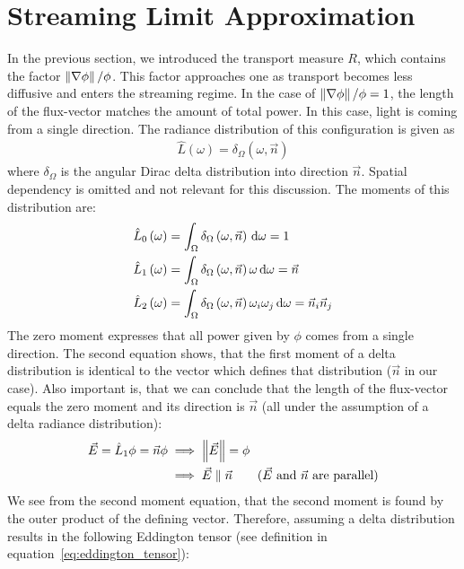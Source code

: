 \section{Streaming Limit Approximation}
\label{sec:fld_streaming_limit_approximation}


In the previous section, we introduced the transport measure $R$, which contains the factor $\left\lVert\nabla\phi\right\rVert/\phi$. This factor approaches one as transport becomes less diffusive and enters the streaming regime. In the case of $\left\lVert\nabla\phi\right\rVert/\phi=1$, the length of the flux-vector matches the amount of total power. In this case, light is coming from a single direction. The radiance distribution of this configuration is given as
\begin{align}
\hat{L}\left(\omega\right)=\delta_{\Omega}\left(\omega,\vec{n}\right)
\end{align}
where $\delta_{\Omega}$ is the angular Dirac delta distribution into direction $\vec{n}$. Spatial dependency is omitted and not relevant for this discussion. The moments of this distribution are:
\begin{align}
\label{eq:zero_moment_Lhat}
\hat{L}_0\left(\omega\right)&=\int_{\Omega}{\delta_{\Omega}\left(\omega,\vec{n}\right)\,\mathrm{d}\omega} = 1\\
\label{eq:first_moment_Lhat}
\hat{L}_1\left(\omega\right)&=\int_{\Omega}{\delta_{\Omega}\left(\omega,\vec{n}\right)\omega\,\mathrm{d}\omega} = \vec{n}\\
\label{eq:second_moment_Lhat}
\hat{L}_2\left(\omega\right)&=\int_{\Omega}{\delta_{\Omega}\left(\omega,\vec{n}\right)\omega_i\omega_j\,\mathrm{d}\omega} = \vec{n}_i\vec{n}_j
\end{align}
The zero moment expresses that all power given by $\phi$ comes from a single direction. The second equation shows, that the first moment of a delta distribution is identical to the vector which defines that distribution ($\vec{n}$ in our case). Also important is, that we can conclude that the length of the flux-vector equals the zero moment and its direction is $\vec{n}$ (all under the assumption of a delta radiance distribution):
\begin{align}
\label{eq:iso_delta_normE}
\vec{E} = \hat{L}_1\phi = \vec{n}\phi  &\implies \left\lVert\vec{E}\right\rVert = \phi\\
&\implies \vec{E} \parallel \vec{n} \qquad \text{($\vec{E}$ and $\vec{n}$ are parallel)}
\end{align}
We see from the second moment equation, that the second moment is found by the outer product of the defining vector. Therefore, assuming a delta distribution results in the following Eddington tensor (see definition in equation~\ref{eq:eddington_tensor}):
